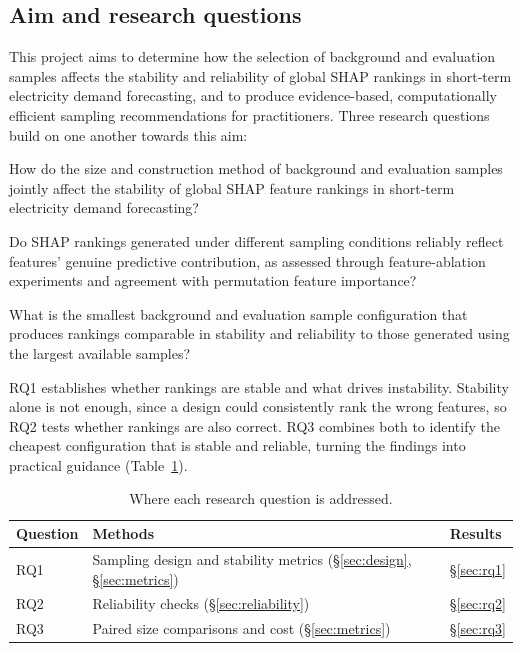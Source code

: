 \documentclass[11pt,a4paper]{article}
\begin{document}
\subsection{Aim and research questions}

This project aims to determine how the selection of background and evaluation samples affects the stability and reliability of global SHAP rankings in short-term electricity demand forecasting, and to produce evidence-based, computationally efficient sampling recommendations for practitioners. Three research questions build on one another towards this aim:

\begin{description}[leftmargin=1.2cm,style=nextline]
  \item[RQ1] How do the size and construction method of background and evaluation samples jointly affect the stability of global SHAP feature rankings in short-term electricity demand forecasting?
  \item[RQ2] Do SHAP rankings generated under different sampling conditions reliably reflect features' genuine predictive contribution, as assessed through feature-ablation experiments and agreement with permutation feature importance?
  \item[RQ3] What is the smallest background and evaluation sample configuration that produces rankings comparable in stability and reliability to those generated using the largest available samples?
\end{description}

RQ1 establishes whether rankings are stable and what drives instability. Stability alone is not enough, since a design could consistently rank the wrong features, so RQ2 tests whether rankings are also correct. RQ3 combines both to identify the cheapest configuration that is stable and reliable, turning the findings into practical guidance (Table~\ref{tab:rq-map}).

\begin{table}[htbp]
\centering\small
\caption{Where each research question is addressed.}
\label{tab:rq-map}
\begin{tabular}{lll}
\toprule
Question & Methods & Results \\
\midrule
RQ1 & Sampling design and stability metrics (\S\ref{sec:design}, \S\ref{sec:metrics}) & \S\ref{sec:rq1} \\
RQ2 & Reliability checks (\S\ref{sec:reliability}) & \S\ref{sec:rq2} \\
RQ3 & Paired size comparisons and cost (\S\ref{sec:metrics}) & \S\ref{sec:rq3} \\
\bottomrule
\end{tabular}
\end{table}
\end{document}

